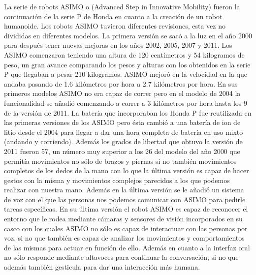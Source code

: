 La serie de robots ASIMO o (Advanced Step in Innovative Mobility) fueron la continuación de la serie P de Honda en cuanto a la creación de un robot humanoide. Los robots ASIMO tuvieron diferentes revisiones, esta vez no divididas en diferentes modelos. La primera versión se sacó a la luz en el año 2000 para después tener nuevas mejoras en los años 2002, 2005, 2007 y 2011. Los ASIMO comenzaron teniendo una altura de 120 centímetros y 54 kilogramos de peso, un gran avance comparando los pesos y alturas con los obtenidos en la serie P que llegaban a pesar 210 kilogramos. ASIMO mejoró en la velocidad en la que andaba pasando de 1.6 kilómetros por hora a 2.7 kilómetros por hora. En sus primeros modelos ASIMO no era capaz de correr pero en el modelo de 2004 la funcionalidad se añadió comenzando a correr a 3 kilómetros por hora hasta los 9 de la versión de 2011. La batería que incorporaban los Honda P fue reutilizada en las primeras versiones de los ASIMO pero ésta cambió a una batería de ion de litio desde el 2004 para llegar a dar una hora completa de batería en uso mixto (andando y corriendo). Además los grados de libertad que obtuvo la versión de 2011 fueron 57, un número muy superior a los 26 del modelo del año 2000 que permitía movimientos no sólo de brazos y piernas si no también movimientos completos de los dedos de la mano con lo que la última versión es capaz de hacer gestos con la misma y movimientos complejos parecidos a los que podemos realizar con nuestra mano. Además en la última versión se le añadió un sistema de voz con el que las personas nos podemos comunicar con ASIMO para pedirle tareas específicas. En su última versión el robot ASIMO es capaz de reconocer el entorno que le rodea mediante cámaras y sensores de visión incorporados en su casco con los cuales ASIMO no sólo es capaz de interactuar con las personas por voz, si no que también es capaz de analizar los movimientos y comportamientos de las mismas para actuar en función de ello. Además en cuanto a la interfaz oral no sólo responde mediante altavoces para continuar la conversación, si no que además también gesticula para dar una interacción más humana.

